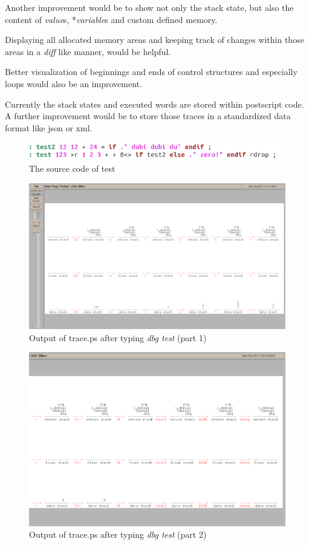 Another improvement would be to show not only the stack state, but also the content of \emph{value}s, *\emph{variable}s and custom defined memory.

Displaying all allocated memory areas and keeping track of changes within those areas in a \emph{diff} like manner,  would be helpful.

Better visualization of beginnings and ends of control structures and especially loops would also be an improvement.

Currently the stack states and executed words are stored within postscript code. A further improvement would be to store those traces in a standardized data format like json or xml.

\begin{figure}[p]
    \centering
    \includegraphics[scale=0.50]{graphics/gfvis-test+test2_src.png}
    \caption{The source code of test}
    \label{fig:gfvis-test-src}
\end{figure}

\begin{figure}
    \centering
    \includegraphics[scale=0.30]{graphics/traceps1.png}
    \caption{Output of trace.ps after typing \emph{dbg test} (part 1)}
    \label{fig:traceps1}
\end{figure}

\begin{figure}
    \centering
    \includegraphics[scale=0.30]{graphics/traceps2.png}
    \caption{Output of trace.ps after typing \emph{dbg test} (part 2)}
    \label{fig:traceps2}
\end{figure}